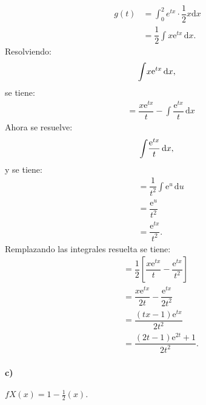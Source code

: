 \documentclass{article}
\begin{document}
\begin{align}
   g(t) &= \displaystyle\int_{0}^2 {e}^{tx}\cdot\dfrac{1}{2}x{\mathrm{d}x}   \\
        &=  \dfrac{1}{2}{\displaystyle\int}x\mathrm{e}^{tx}\,\mathrm{d}x.
\end{align}
   Resolviendo: 
    \begin{equation*}
        {\displaystyle\int}x\mathrm{e}^{tx}\,\mathrm{d}x,\\
    \end{equation*}
    se tiene:
        \begin{align}
         &= \dfrac{x\mathrm{e}^{tx}}{t}-{\displaystyle\int}\dfrac{\mathrm{e}^{tx}}{t}\,\mathrm{d}x
         \end{align}
          Ahora se resuelve: 
    \begin{equation*}
        {\displaystyle\int}\dfrac{\mathrm{e}^{tx}}{t}\,\mathrm{d}x,\\
    \end{equation*}  
    y se tiene:
   \begin{align}      
        &=  \dfrac{1}{t^2}{\displaystyle\int}\mathrm{e}^u\,\mathrm{d}u \\
        &=  \dfrac{\mathrm{e}^u}{t^2} \\
        &=   \dfrac{\mathrm{e}^{tx}}{t^2}.
\end{align}
Remplazando las integrales resuelta se tiene:
 \begin{align}
 &=\dfrac{1}{2}\left[\dfrac{x\mathrm{e}^{tx}}{t}-\dfrac{\mathrm{e}^{tx}}{t^2}\right]\\
 &= \dfrac{x\mathrm{e}^{tx}}{2t}-\dfrac{\mathrm{e}^{tx}}{2t^2}\\
  &=   \dfrac{\left(tx-1\right)\mathrm{e}^{tx}}{2t^2}\\
  &= \dfrac{\left(2t-1\right)\mathrm{e}^{2t}+1}{2t^2}.
\end{align}

\paragraph{c)}
$fX(x) = 1-\frac{1}{2}(x).$
\end{document}
